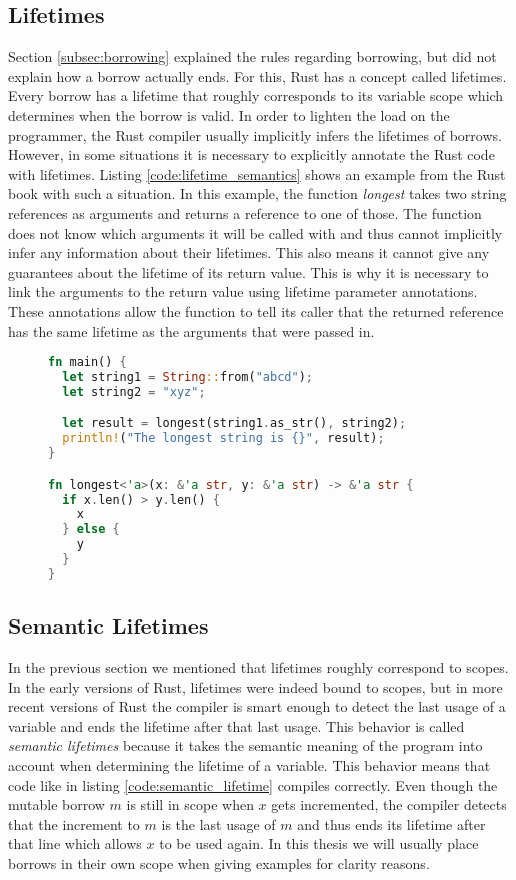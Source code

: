 \subsection{Lifetimes}
Section \ref{subsec:borrowing} explained the rules regarding borrowing, but did not explain how a borrow actually ends.
For this, Rust has a concept called lifetimes.
Every borrow has a lifetime that roughly corresponds to its variable scope which determines when the borrow is valid.
In order to lighten the load on the programmer, the Rust compiler usually implicitly infers the lifetimes of borrows.
However, in some situations it is necessary to explicitly annotate the Rust code with lifetimes.
Listing \ref{code:lifetime_semantics} shows an example from the Rust book \cite{rustbook} with such a situation.
In this example, the function \textit{longest} takes two string references as arguments and returns a reference to one of those.
The function does not know which arguments it will be called with and thus cannot implicitly infer any information about their lifetimes.
This also means it cannot give any guarantees about the lifetime of its return value.
This is why it is necessary to link the arguments to the return value using lifetime parameter annotations.
These annotations allow the function to tell its caller that the returned reference has the same lifetime as the arguments that were passed in.

\begin{figure}[h]
\begin{lstlisting}[language=Rust,frame=single,caption=Lifetime example,label=code:lifetime_semantics]
fn main() {
  let string1 = String::from("abcd");
  let string2 = "xyz";

  let result = longest(string1.as_str(), string2);
  println!("The longest string is {}", result);
}

fn longest<'a>(x: &'a str, y: &'a str) -> &'a str {
  if x.len() > y.len() {
    x
  } else {
    y
  }
}
\end{lstlisting}
\end{figure}

\subsection{Semantic Lifetimes}
\label{sec:semantic_lifetimes}
In the previous section we mentioned that lifetimes roughly correspond to scopes.
In the early versions of Rust, lifetimes were indeed bound to scopes, but in more recent versions of Rust the compiler is smart enough to detect the last usage of a variable and ends the lifetime after that last usage.
This behavior is called \textit{semantic lifetimes} because it takes the semantic meaning of the program into account when determining the lifetime of a variable.
This behavior means that code like in listing \ref{code:semantic_lifetime} compiles correctly.
Even though the mutable borrow $m$ is still in scope when $x$ gets incremented, the compiler detects that the increment to $m$ is the last usage of $m$ and thus ends its lifetime after that line which allows $x$ to be used again.
In this thesis we will usually place borrows in their own scope when giving examples for clarity reasons.

